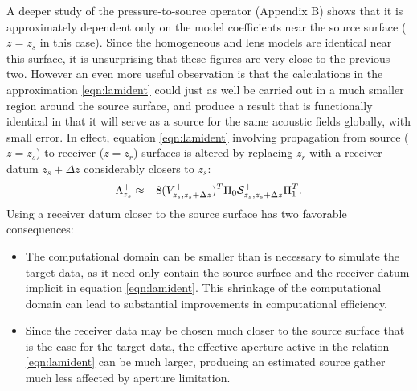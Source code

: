 A deeper study of the pressure-to-source
operator (Appendix B) shows that it is approximately dependent only on the model
coefficients near the source surface ($z=z_s$ in this case). Since the
homogeneous and lens models are identical near this surface, it is
unsurprising that these figures are very close to the previous two.
However an even more useful observation is that the calculations in
the approximation \ref{eqn:lamident} could just as well be carried out
in a much smaller region around the source surface, and produce a
result that is functionally identical in that it will serve as a
source for the same acoustic fields globally, with small error. In
effect, equation \ref{eqn:lamident} involving propagation from source
($z=z_s$) to receiver ($z=z_r$) surfaces is altered by replacing $z_r$
with a receiver datum $z_s+\Delta z$ considerably closers to $z_s$:
\begin{equation}
  \label{eqn:lamnear}
  \Lambda^+_{z_s} \approx -8(V^{+}_{z_s,z_s+\Delta z})^T\Pi_0 {\cal
    S}^+_{z_s,z_s+\Delta z}\Pi_1^T.
\end{equation}
Using a receiver datum closer to the source surface has two favorable consequences:
\begin{itemize}
\item The computational domain can be smaller than is necessary to
  simulate the target data, as it need only contain the source
  surface and the receiver datum implicit in
  equation \ref{eqn:lamident}. This shrinkage of the computational
  domain can lead to substantial improvements in computational
  efficiency.
\item Since the receiver data may be chosen much closer to the
  source surface that is the case for the target data, the effective
  aperture active in the relation \ref{eqn:lamident} can be much
  larger, producing an estimated source gather much less affected by
  aperture limitation.
\end{itemize}

